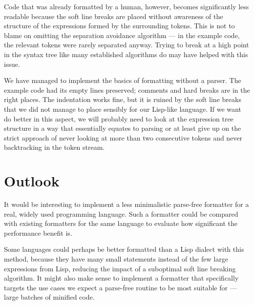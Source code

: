 Code that was already formatted by a human, however,
becomes significantly less readable
because the soft line breaks are placed
without awareness of the structure of the expressions
formed by the surrounding tokens.
This is not to blame on omitting the separation avoidance algorithm ---
in the example code, the relevant tokens were rarely separated anyway.
Trying to break at a high point in the syntax tree
like many established algorithms do
may have helped with this issue.

We have managed to implement the basics of formatting without a parser.
The example code had its empty lines preserved;
comments and hard breaks are in the right places.
The indentation works fine, but it is ruined by
the soft line breaks that we did not manage to place sensibly
for our Lisp-like language.
If we want do better in this aspect,
we will probably need to look at the expression tree structure
in a way that essentially equates to parsing
or at least give up on the strict approach
of never looking at more than two consecutive tokens
and never backtracking in the token stream.

\section{Outlook}
It would be interesting to implement a
less minimalistic parse-free formatter
for a real, widely used programming language.
Such a formatter could be compared with
existing formatters for the same language
to evaluate how significant the performance benefit is.

Some languages could perhaps be
better formatted than a Lisp dialect with this method,
because they have many small statements
instead of the few large expressions from Lisp,
reducing the impact of a suboptimal soft line breaking algorithm.
It might also make sense to implement a formatter
that specifically targets the use cases
we expect a parse-free routine to be most suitable for
--- large batches of minified code.
